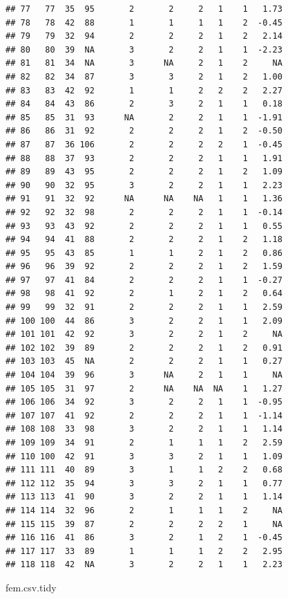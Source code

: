 \documentclass[
]{book}
\newenvironment{Shaded}{\begin{snugshade}}{\end{snugshade}}
\newcommand{\NormalTok}[1]{#1}
\theoremstyle{definition}
\theoremstyle{definition}
\theoremstyle{definition}
\theoremstyle{definition}
\theoremstyle{remark}
\begin{document}
\begin{verbatim}
## 77   77  35  95       2       2     2   1    1   1.73
## 78   78  42  88       1       1     1   1    2  -0.45
## 79   79  32  94       2       2     2   1    2   2.14
## 80   80  39  NA       3       2     2   1    1  -2.23
## 81   81  34  NA       3      NA     2   1    2     NA
## 82   82  34  87       3       3     2   1    2   1.00
## 83   83  42  92       1       1     2   2    2   2.27
## 84   84  43  86       2       3     2   1    1   0.18
## 85   85  31  93      NA       2     2   1    1  -1.91
## 86   86  31  92       2       2     2   1    2  -0.50
## 87   87  36 106       2       2     2   2    1  -0.45
## 88   88  37  93       2       2     2   1    1   1.91
## 89   89  43  95       2       2     2   1    2   1.09
## 90   90  32  95       3       2     2   1    1   2.23
## 91   91  32  92      NA      NA    NA   1    1   1.36
## 92   92  32  98       2       2     2   1    1  -0.14
## 93   93  43  92       2       2     2   1    1   0.55
## 94   94  41  88       2       2     2   1    2   1.18
## 95   95  43  85       1       1     2   1    2   0.86
## 96   96  39  92       2       2     2   1    2   1.59
## 97   97  41  84       2       2     2   1    1  -0.27
## 98   98  41  92       2       1     2   1    2   0.64
## 99   99  32  91       2       2     2   1    1   2.59
## 100 100  44  86       3       2     2   1    1   2.09
## 101 101  42  92       3       2     2   1    2     NA
## 102 102  39  89       2       2     2   1    2   0.91
## 103 103  45  NA       2       2     2   1    1   0.27
## 104 104  39  96       3      NA     2   1    1     NA
## 105 105  31  97       2      NA    NA  NA    1   1.27
## 106 106  34  92       3       2     2   1    1  -0.95
## 107 107  41  92       2       2     2   1    1  -1.14
## 108 108  33  98       3       2     2   1    1   1.14
## 109 109  34  91       2       1     1   1    2   2.59
## 110 100  42  91       3       3     2   1    1   1.09
## 111 111  40  89       3       1     1   2    2   0.68
## 112 112  35  94       3       3     2   1    1   0.77
## 113 113  41  90       3       2     2   1    1   1.14
## 114 114  32  96       2       1     1   1    2     NA
## 115 115  39  87       2       2     2   2    1     NA
## 116 116  41  86       3       2     1   2    1  -0.45
## 117 117  33  89       1       1     1   2    2   2.95
## 118 118  42  NA       3       2     2   1    1   2.23
\end{verbatim}

\begin{Shaded}
\begin{Highlighting}[]
\NormalTok{fem.csv.tidy}
\end{Highlighting}
\end{Shaded}
\end{document}
